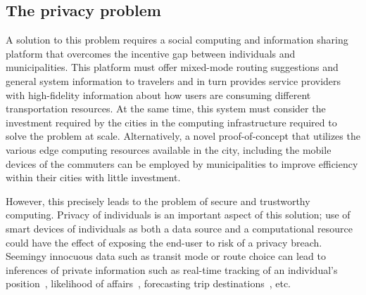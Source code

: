 \documentclass[12pt,letterpaper]{article}
\begin{document}
\subsection{The privacy problem}
A solution to this problem requires a social computing and information sharing platform that overcomes the incentive gap between individuals and municipalities. This platform must offer mixed-mode routing suggestions and general system information to travelers and in turn provides service providers with high-fidelity information about how users are consuming different transportation resources. At the same time, this system must consider the investment required by the cities in the computing infrastructure required to solve the problem at scale. Alternatively, a novel proof-of-concept that utilizes the various edge computing resources available in the city, including the mobile devices of the commuters can be employed by municipalities to improve efficiency within their cities with little investment.

However, this precisely leads to the problem of secure and trustworthy computing.  Privacy of individuals is an important aspect of this solution; use of smart devices of individuals as both a data source and a computational resource  could have the effect of exposing the end-user to risk of a privacy breach. Seemingy innocuous data such as transit mode or route choice can lead to inferences of
private information such as real-time tracking of an individual's position~\cite{koufogiannis:2015aa}, likelihood of affairs~\cite{mueffelmann:2015aa}, forecasting trip destinations~\cite{dewri:2013aa}, etc.


\clearpage


\end{document}

